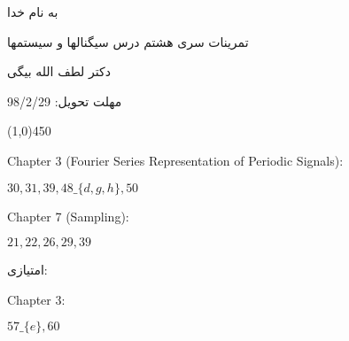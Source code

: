 \documentclass[50pt]{article}
\newcommand{\hl}{
\begin{center}
\line(1,0){450}
\end{center}}
\begin{document}
\setLTR 




\begin{RTL}
\Large{








\begin{center}
به نام خدا

تمرینات سری هشتم درس سیگنالها و سیستمها

دکتر لطف الله بیگی

مهلت تحویل: 98/2/29
\end{center}

\hl
\begin{latin}
Chapter 3 (Fourier Series Representation of Periodic Signals):

$30,31,39,48\_\{d,g,h\},50$

Chapter 7 (Sampling):

$21, 22, 26 ,29, 39$
\end{latin}

امتیازی:

\begin{latin}
Chapter 3:

$57\_\{e\},60$
\end{latin}



















}
\end{RTL}
\end{document}
